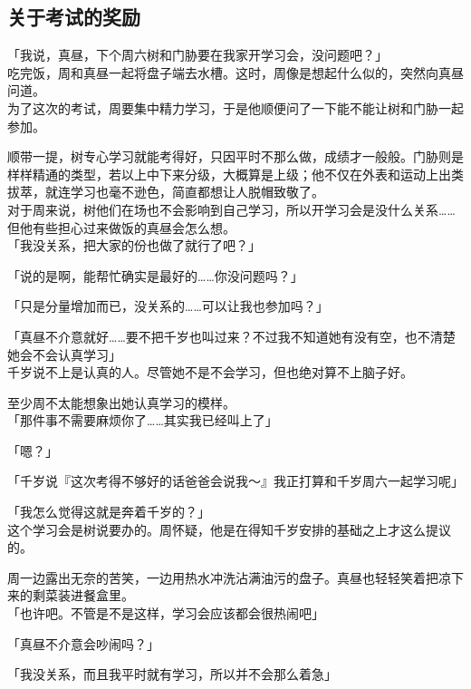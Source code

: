 \subsection{关于考试的奖励}

「我说，真昼，下个周六树和门胁要在我家开学习会，没问题吧？」\\

吃完饭，周和真昼一起将盘子端去水槽。这时，周像是想起什么似的，突然向真昼问道。\\

为了这次的考试，周要集中精力学习，于是他顺便问了一下能不能让树和门胁一起参加。

顺带一提，树专心学习就能考得好，只因平时不那么做，成绩才一般般。门胁则是样样精通的类型，若以上中下来分级，大概算是上级；他不仅在外表和运动上出类拔萃，就连学习也毫不逊色，简直都想让人脱帽致敬了。\\

对于周来说，树他们在场也不会影响到自己学习，所以开学习会是没什么关系……但他有些担心过来做饭的真昼会怎么想。\\

「我没关系，把大家的份也做了就行了吧？」

「说的是啊，能帮忙确实是最好的……你没问题吗？」

「只是分量增加而已，没关系的……可以让我也参加吗？」

「真昼不介意就好……要不把千岁也叫过来？不过我不知道她有没有空，也不清楚她会不会认真学习」\\

千岁说不上是认真的人。尽管她不是不会学习，但也绝对算不上脑子好。

至少周不太能想象出她认真学习的模样。\\

「那件事不需要麻烦你了……其实我已经叫上了」

「嗯？」

「千岁说『这次考得不够好的话爸爸会说我～』我正打算和千岁周六一起学习呢」

「我怎么觉得这就是奔着千岁的？」\\

这个学习会是树说要办的。周怀疑，他是在得知千岁安排的基础之上才这么提议的。

周一边露出无奈的苦笑，一边用热水冲洗沾满油污的盘子。真昼也轻轻笑着把凉下来的剩菜装进餐盒里。\\

「也许吧。不管是不是这样，学习会应该都会很热闹吧」

「真昼不介意会吵闹吗？」

「我没关系，而且我平时就有学习，所以并不会那么着急」\\

